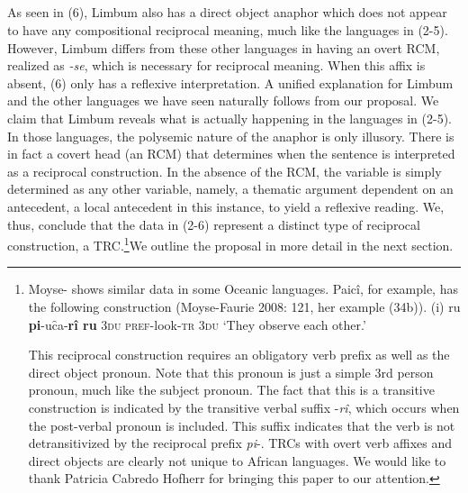 \begin{listWWviiiNumxlileveli}
\item \ea\label{ex:}
\\
\ea\label{ex:}
\\
\ea\label{ex:}
\\
\ea\label{ex:}
\\
\end{listWWviiiNumxlileveli}

As seen in (6), Limbum also has a direct object anaphor which does not appear to have any compositional reciprocal meaning, much like the languages in (2-5). However, Limbum differs from these other languages in having an overt RCM, realized as \textit{{}-se}, which is necessary for reciprocal meaning. When this affix is absent, (6) only has a reflexive interpretation. A unified explanation for Limbum and the other languages we have seen naturally follows from our proposal. We claim that Limbum reveals what is actually happening in the languages in (2-5). In those languages, the polysemic nature of the anaphor is only illusory. There is in fact a covert head (an RCM) that determines when the sentence is interpreted as a reciprocal construction. In the absence of the RCM, the variable is simply determined as any other variable, namely, a thematic argument dependent on an antecedent, a local antecedent in this instance, to yield a reflexive reading. We, thus, conclude that the data in (2-6) represent a distinct type of reciprocal construction, a TRC.\footnote{ Moyse-\citet{Faurie2008} shows similar data in some Oceanic languages. Paicî, for example, has the following construction (Moyse-Faurie 2008: 121, her example (34b)).
(i)  ru  \textbf{pi}{}-uc̑a-\textbf{rî  ru}
\textsc{  }\textsc{3du}  \textsc{pref}{}-look-\textsc{tr}  \textsc{3du}
  ‘They observe each other.’

This reciprocal construction requires an obligatory verb prefix as well as the direct object pronoun. Note that this pronoun is just a simple 3rd person pronoun, much like the subject pronoun. The fact that this is a transitive construction is indicated by the transitive verbal suffix -\textit{rî}, which occurs when the post-verbal pronoun is included. This suffix indicates that the verb is not detransitivized by the reciprocal prefix \textit{pi}{}-. TRCs with overt verb affixes and direct objects are clearly not unique to African languages. We would like to thank Patricia Cabredo Hofherr for bringing this paper to our attention.}\textstyleCommentReference{ }We outline the proposal in more detail in the next section.

